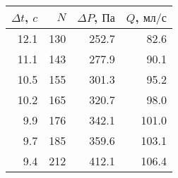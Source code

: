 \begin{tabular}{rrrr}
\toprule
$\Delta t$, $c$ & $N$ & $\Delta P$, $Па$ & $Q$, $мл/с$ \\
\midrule
12.1 & 130 & 252.7 & 82.6 \\
11.1 & 143 & 277.9 & 90.1 \\
10.5 & 155 & 301.3 & 95.2 \\
10.2 & 165 & 320.7 & 98.0 \\
9.9 & 176 & 342.1 & 101.0 \\
9.7 & 185 & 359.6 & 103.1 \\
9.4 & 212 & 412.1 & 106.4 \\
\bottomrule
\end{tabular}
